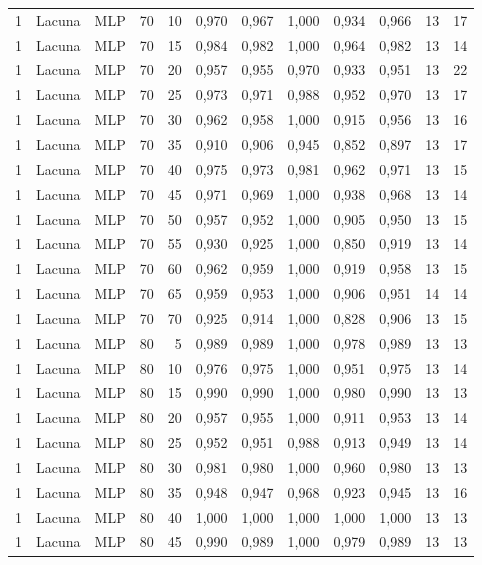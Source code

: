 \begin{longtable}{@{}rllrrrrrrrrr@{}}
1 & Lacuna & MLP & 70 & 10 & 0,970 & 0,967 & 1,000 & 0,934 & 0,966 & 13 & 17 \\
1 & Lacuna & MLP & 70 & 15 & 0,984 & 0,982 & 1,000 & 0,964 & 0,982 & 13 & 14 \\
1 & Lacuna & MLP & 70 & 20 & 0,957 & 0,955 & 0,970 & 0,933 & 0,951 & 13 & 22 \\
1 & Lacuna & MLP & 70 & 25 & 0,973 & 0,971 & 0,988 & 0,952 & 0,970 & 13 & 17 \\
1 & Lacuna & MLP & 70 & 30 & 0,962 & 0,958 & 1,000 & 0,915 & 0,956 & 13 & 16 \\
1 & Lacuna & MLP & 70 & 35 & 0,910 & 0,906 & 0,945 & 0,852 & 0,897 & 13 & 17 \\
1 & Lacuna & MLP & 70 & 40 & 0,975 & 0,973 & 0,981 & 0,962 & 0,971 & 13 & 15 \\
1 & Lacuna & MLP & 70 & 45 & 0,971 & 0,969 & 1,000 & 0,938 & 0,968 & 13 & 14 \\
1 & Lacuna & MLP & 70 & 50 & 0,957 & 0,952 & 1,000 & 0,905 & 0,950 & 13 & 15 \\
1 & Lacuna & MLP & 70 & 55 & 0,930 & 0,925 & 1,000 & 0,850 & 0,919 & 13 & 14 \\
1 & Lacuna & MLP & 70 & 60 & 0,962 & 0,959 & 1,000 & 0,919 & 0,958 & 13 & 15 \\
1 & Lacuna & MLP & 70 & 65 & 0,959 & 0,953 & 1,000 & 0,906 & 0,951 & 14 & 14 \\
1 & Lacuna & MLP & 70 & 70 & 0,925 & 0,914 & 1,000 & 0,828 & 0,906 & 13 & 15 \\
1 & Lacuna & MLP & 80 & 5 & 0,989 & 0,989 & 1,000 & 0,978 & 0,989 & 13 & 13 \\
1 & Lacuna & MLP & 80 & 10 & 0,976 & 0,975 & 1,000 & 0,951 & 0,975 & 13 & 14 \\
1 & Lacuna & MLP & 80 & 15 & 0,990 & 0,990 & 1,000 & 0,980 & 0,990 & 13 & 13 \\
1 & Lacuna & MLP & 80 & 20 & 0,957 & 0,955 & 1,000 & 0,911 & 0,953 & 13 & 14 \\
1 & Lacuna & MLP & 80 & 25 & 0,952 & 0,951 & 0,988 & 0,913 & 0,949 & 13 & 14 \\
1 & Lacuna & MLP & 80 & 30 & 0,981 & 0,980 & 1,000 & 0,960 & 0,980 & 13 & 13 \\
1 & Lacuna & MLP & 80 & 35 & 0,948 & 0,947 & 0,968 & 0,923 & 0,945 & 13 & 16 \\
1 & Lacuna & MLP & 80 & 40 & 1,000 & 1,000 & 1,000 & 1,000 & 1,000 & 13 & 13 \\
1 & Lacuna & MLP & 80 & 45 & 0,990 & 0,989 & 1,000 & 0,979 & 0,989 & 13 & 13 \\

\end{longtable}
